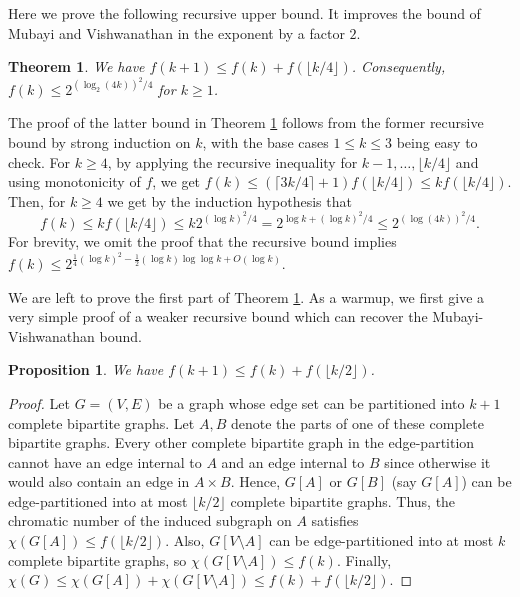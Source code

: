 \documentclass[10pt,a4paper]{amsart}
\newtheorem{proposition}{Proposition}
\newtheorem{theorem}{Theorem}
\begin{document}
Here we prove the following recursive upper bound. It improves the bound of Mubayi and Vishwanathan in the exponent by a factor $2$. 


\begin{theorem}\label{main}
We have $f(k+1) \leq f(k)+f(\lfloor k/4 \rfloor)$. Consequently, $f(k) \leq 2^{(\log_2 (4k))^2/4}$ for $k \geq 1$. 
\end{theorem}


The proof of the latter bound in Theorem \ref{main} follows from the former recursive bound by strong induction on $k$, with the base cases $1 \leq k \leq 3$ being easy to check. For $k \geq 4$, by applying the recursive inequality for $k-1,\ldots,\lfloor k/4 \rfloor$ and using monotonicity of $f$, we get $f(k) \leq (\lceil 3k/4 \rceil +1)f(\lfloor k/4 \rfloor) \leq kf(\lfloor k/4 \rfloor)$. Then, for $k \geq 4$ we get by the induction hypothesis that $$f(k) \leq kf(\lfloor k/4 \rfloor) \leq k2^{(\log k)^2/4} = 2^{\log k + (\log k)^2/4} \leq 2^{(\log(4k))^2 /4}.$$
For brevity, we omit the proof that the recursive bound implies $f(k) \leq 2^{\frac{1}{4}(\log k)^2 - \frac{1}{2}(\log k)\log \log k +O(\log k)}$.


We are left to prove the first part of Theorem \ref{main}. As a warmup, we first give a very simple proof of a weaker recursive bound which can recover the Mubayi-Vishwanathan bound. 

\begin{proposition}\label{easier}
We have $f(k+1) \leq f(k)+f(\lfloor k/2 \rfloor)$. \end{proposition}
\begin{proof}
Let $G=(V,E)$ be a graph whose edge set can be partitioned into $k+1$ complete bipartite graphs. Let $A,B$ denote the parts of one of these complete bipartite graphs. Every other complete bipartite graph in the edge-partition cannot have  an edge internal to $A$ and an edge internal to $B$ since otherwise it would also contain an edge in $A \times B$. Hence, $G[A]$ or $G[B]$ (say $G[A]$) can be edge-partitioned into at most $\lfloor k/2 \rfloor$ complete bipartite graphs. Thus, the chromatic number of the induced subgraph on $A$ satisfies $\chi(G[A]) \leq f(\lfloor k/2 \rfloor)$. Also, $G[V \setminus A]$ can be edge-partitioned into at most $k$ complete bipartite graphs, so $\chi(G[V \setminus A]) \leq f(k)$. 
Finally, $\chi(G) \leq \chi(G[A])+\chi(G[V \setminus A]) \leq  f(k)+f(\lfloor k/2 \rfloor)$. 
\end{proof}
\end{document}
